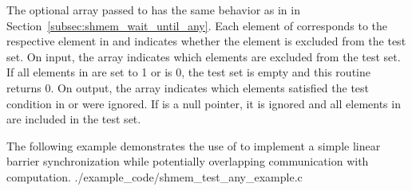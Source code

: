 \begin{apidefinition}
{    The optional  array passed to  has the
    same behavior as in  in
    Section~\ref{subsec:shmem_wait_until_any}.   Each element of 
    corresponds to the respective element in  and indicates whether
    the element is excluded from the test set.  On input, the 
    array indicates which elements are excluded from the test set.  If all
    elements in  are set to 1 or  is 0, the test set is
    empty and this routine returns 0.  On output, the  array
    indicates which elements satisfied the test condition in  or
    were ignored.  If  is a null pointer, it is ignored and all
    elements in  are included in the test set.
}



\begin{apiexamples}
  \apicexample
      {The following \CorCpp{} example demonstrates the use of
       to implement a simple linear barrier
      synchronization while potentially overlapping communication with
      computation.}
      {./example_code/shmem_test_any_example.c}
      {}
\end{apiexamples}

\end{apidefinition}
